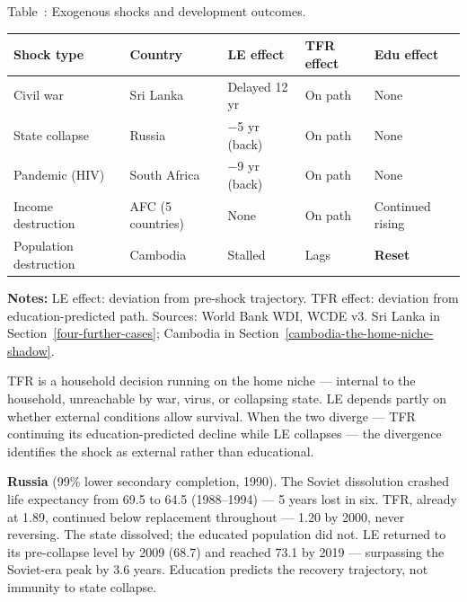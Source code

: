 \documentclass[12pt,letterpaper]{article}
\begin{document}
\label{tab:shock}Table~\thetable: Exogenous shocks and development outcomes.

{\small
\begin{longtable}[]{@{}
  >{\raggedright\arraybackslash}p{}
  >{\raggedright\arraybackslash}p{}
  >{\raggedright\arraybackslash}p{}
  >{\raggedright\arraybackslash}p{}
  >{\raggedright\arraybackslash}p{}@{}}
\toprule
Shock type & Country & LE effect & TFR effect & Edu effect \\
\midrule
\endhead
Civil war & Sri Lanka & Delayed 12 yr & On path & None \\
State collapse & Russia & $-$5 yr (back) & On path & None \\
Pandemic (HIV) & South Africa & $-$9 yr (back) & On path & None \\
Income destruction & AFC (5 countries) & None & On path & Continued rising \\
Population destruction & Cambodia & Stalled & Lags & \textbf{Reset} \\
\bottomrule
\end{longtable}\addtocounter{table}{-1}%
}

\begin{minipage}{\dimexpr\textwidth-2em}
\scriptsize
\textbf{Notes:} LE effect: deviation from pre-shock trajectory. TFR
effect: deviation from education-predicted path. Sources: World Bank
WDI, WCDE v3. Sri Lanka in Section~\ref{four-further-cases}; Cambodia in
Section~\ref{cambodia-the-home-niche-shadow}.
\end{minipage}

TFR is a household decision running on the home niche --- internal to
the household, unreachable by war, virus, or collapsing state. LE depends partly on
whether external conditions allow survival. When the two diverge --- TFR
continuing its education-predicted decline while LE collapses --- the
divergence identifies the shock as external rather than educational.

\textbf{Russia} (99\% lower secondary completion, 1990). The Soviet
dissolution crashed life expectancy from 69.5 to 64.5 (1988--1994) ---
5 years lost in six. TFR, already at 1.89, continued below replacement
throughout --- 1.20 by 2000, never reversing. The state dissolved; the
educated population did not. LE returned to its pre-collapse level by
2009 (68.7) and reached 73.1 by 2019 --- surpassing the Soviet-era peak
by 3.6 years. Education predicts the recovery trajectory, not immunity
to state collapse.
\end{document}

